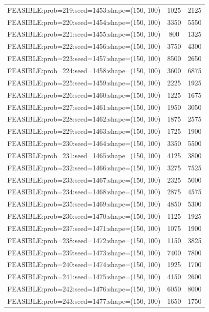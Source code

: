 \begin{longtable}{lcc}
FEASIBLE:prob=219:seed=1453:shape=(150, 100) &     1025 &  2125 \\
FEASIBLE:prob=220:seed=1454:shape=(150, 100) &     3350 &  5550 \\
FEASIBLE:prob=221:seed=1455:shape=(150, 100) &      800 &  1325 \\
FEASIBLE:prob=222:seed=1456:shape=(150, 100) &     3750 &  4300 \\
FEASIBLE:prob=223:seed=1457:shape=(150, 100) &     8500 &  2650 \\
FEASIBLE:prob=224:seed=1458:shape=(150, 100) &     3600 &  6875 \\
FEASIBLE:prob=225:seed=1459:shape=(150, 100) &     2225 &  1925 \\
FEASIBLE:prob=226:seed=1460:shape=(150, 100) &     1225 &  1675 \\
FEASIBLE:prob=227:seed=1461:shape=(150, 100) &     1950 &  3050 \\
FEASIBLE:prob=228:seed=1462:shape=(150, 100) &     1875 &  2575 \\
FEASIBLE:prob=229:seed=1463:shape=(150, 100) &     1725 &  1900 \\
FEASIBLE:prob=230:seed=1464:shape=(150, 100) &     3350 &  5500 \\
FEASIBLE:prob=231:seed=1465:shape=(150, 100) &     4125 &  3800 \\
FEASIBLE:prob=232:seed=1466:shape=(150, 100) &     3275 &  7525 \\
FEASIBLE:prob=233:seed=1467:shape=(150, 100) &     2325 &  5000 \\
FEASIBLE:prob=234:seed=1468:shape=(150, 100) &     2875 &  4575 \\
FEASIBLE:prob=235:seed=1469:shape=(150, 100) &     4850 &  5300 \\
FEASIBLE:prob=236:seed=1470:shape=(150, 100) &     1125 &  1925 \\
FEASIBLE:prob=237:seed=1471:shape=(150, 100) &     1075 &  1900 \\
FEASIBLE:prob=238:seed=1472:shape=(150, 100) &     1150 &  3825 \\
FEASIBLE:prob=239:seed=1473:shape=(150, 100) &     7400 &  7800 \\
FEASIBLE:prob=240:seed=1474:shape=(150, 100) &     1925 &  1700 \\
FEASIBLE:prob=241:seed=1475:shape=(150, 100) &     4150 &  2600 \\
FEASIBLE:prob=242:seed=1476:shape=(150, 100) &     6050 &  8000 \\
FEASIBLE:prob=243:seed=1477:shape=(150, 100) &     1650 &  1750 \\

\end{longtable}
